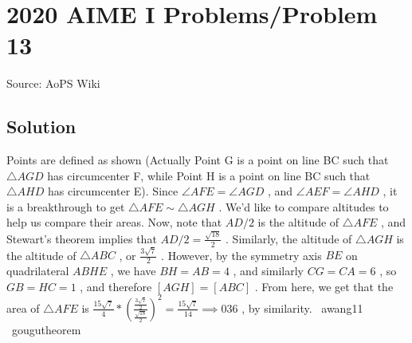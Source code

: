 \documentclass[12pt]{article}
\begin{document}
\section*{{2020 AIME I Problems/Problem 13}}
Source: AoPS Wiki

\subsection*{Solution}
Points are defined as shown (Actually Point G is a point on line BC such that $\triangle AGD$ has circumcenter F, while Point H is a point on line BC such that $\triangle AHD$ has circumcenter E). Since $\angle{AFE} = \angle{AGD}$ , and $\angle{AEF} = \angle{AHD}$ , it is a breakthrough to get $\triangle AFE \sim \triangle AGH$ . We'd like to compare altitudes to help us compare their areas. Now, note that $AD/2$ is the altitude of $\triangle AFE$ , and Stewart's theorem implies that $AD/2 = \frac{\sqrt{18}}{2}$ . Similarly, the altitude of $\triangle AGH$ is the altitude of $\triangle ABC$ , or $\frac{3\sqrt{7}}{2}$ . However, by the symmetry axis $BE$ on quadrilateral $ABHE$ , we have $BH = AB = 4$ , and similarly $CG = CA = 6$ , so $GB = HC = 1$ , and therefore $[AGH] = [ABC]$ . From here, we get that the area of $\triangle AFE$ is $\frac{15\sqrt{7}}{4}*(\frac{\frac{3\sqrt{7}}{2}}{\frac{\sqrt{18}}{2}})^2=\frac{15\sqrt{7}}{14} \implies \boxed{036}$ , by similarity. ~awang11 ~gougutheorem
\end{document}
